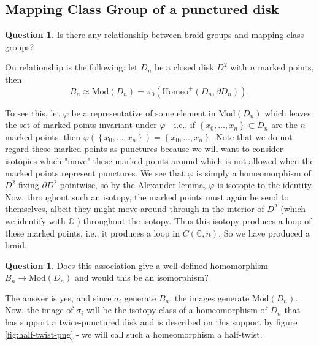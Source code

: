 \documentclass[reqno]{amsart}
\theoremstyle{definition}
\newtheorem{question}[theorem]{Question}
\theoremstyle{remark}
\newcommand{\Mod}{{\mathrm{Mod}}}
\newcommand{\Homeo}{{\mathrm{Homeo}}}
\begin{document}


\subsection{Mapping Class Group of a punctured disk}

\begin{question}
    Is there any relationship between braid groups and
    mapping class groups?
\end{question}



On relationship is the following: 
let $D_n$ be a closed disk $D^2$ with $n$ marked points,
then
\[
B_n \approx \Mod\left( D_n \right) =
\pi_0 \left( \Homeo^{+} \left( D_n, \partial D_n \right)  \right).
\] 

To see this, let $\varphi$ be a representative
of some element in $\Mod \left( D_n \right) $ which
leaves the set of marked points invariant under
$\varphi$ - i.e., if $\left\{ x_0, \ldots,x_n \right\} 
\subset D_n$ are the $n$ marked points, then
$\varphi \left( \left\{ x_0, \ldots,x_n \right\}  \right) 
= \left\{ x_0, \ldots, x_n \right\} $. Note that we
do not regard these marked points as punctures because
we will want to consider isotopies which "move" these
marked points around which is not allowed when the marked points
represent punctures.
We see that
$\varphi $ is simply a homeomorphism of $D^2$ fixing
$\partial D^2$ pointwise, so by the Alexander
lemma, $\varphi $ is isotopic to the identity. Now, throughout
such an isotopy, the marked points must again be send to
themselves, albeit they might move around through
in the interior of $D^2 $ (which we identify with
$\mathbb{C}$ ) throughout the isotopy. Thus
this isotopy produces a loop of these marked points,
i.e., it produces a loop in $C \left( \mathbb{C},n \right) $.
So we have produced a braid.

\begin{question}\label{question-1}
    Does this association give a well-defined homomorphism
    $B_n \to \Mod(D_n) $ and would this be an isomorphism?
\end{question}

The answer is yes, and since $\sigma_i$ generate
$B_n$, the images generate $\Mod(D_n)$. Now, the
image of $\sigma_i$ will be the
isotopy class of a homeomorphism
of $D_n$ that has support a twice-punctured disk and is
described on this support by figure \ref{fig:half-twist-png} - we
will call such a homeomorphism a half-twist.
\end{document}
